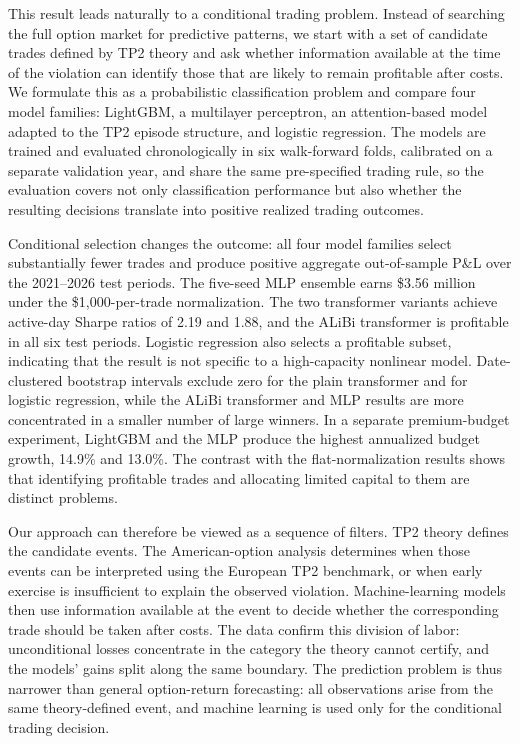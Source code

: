 \documentclass[sigconf]{acmart}
\begin{document}
This result leads naturally to a conditional trading problem. Instead of searching the full option market for predictive patterns, we start with a set of candidate trades defined by TP2 theory and ask whether information available at the time of the violation can identify those that are likely to remain profitable after costs. We formulate this as a probabilistic classification problem and compare four model families: LightGBM, a multilayer perceptron, an attention-based model adapted to the TP2 episode structure, and logistic regression. The models are trained and evaluated chronologically in six walk-forward folds, calibrated on a separate validation year, and share the same pre-specified trading rule, so the evaluation covers not only classification performance but also whether the resulting decisions translate into positive realized trading outcomes.

Conditional selection changes the outcome: all four model families select substantially fewer trades and produce positive aggregate out-of-sample P\&L over the 2021--2026 test periods. The five-seed MLP ensemble earns \$3.56 million under the \$1{,}000-per-trade normalization. The two transformer variants achieve active-day Sharpe ratios of 2.19 and 1.88, and the ALiBi transformer is profitable in all six test periods. Logistic regression also selects a profitable subset, indicating that the result is not specific to a high-capacity nonlinear model. Date-clustered bootstrap intervals exclude zero for the plain transformer and for logistic regression, while the ALiBi transformer and MLP results are more concentrated in a smaller number of large winners. In a separate premium-budget experiment, LightGBM and the MLP produce the highest annualized budget growth, 14.9\% and 13.0\%. The contrast with the flat-normalization results shows that identifying profitable trades and allocating limited capital to them are distinct problems.

Our approach can therefore be viewed as a sequence of filters. TP2 theory defines the candidate events. The American-option analysis determines when those events can be interpreted using the European TP2 benchmark, or when early exercise is insufficient to explain the observed violation. Machine-learning models then use information available at the event to decide whether the corresponding trade should be taken after costs. The data confirm this division of labor: unconditional losses concentrate in the category the theory cannot certify, and the models' gains split along the same boundary. The prediction problem is thus narrower than general option-return forecasting: all observations arise from the same theory-defined event, and machine learning is used only for the conditional trading decision.
\end{document}
